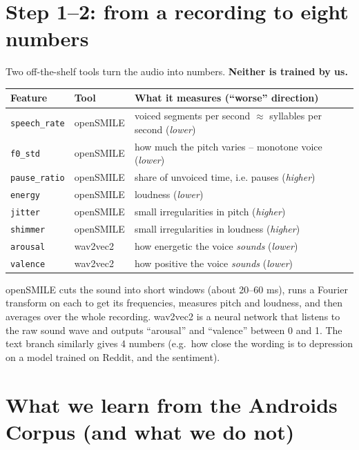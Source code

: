 \documentclass[11pt,a4paper]{article}
\begin{document}
\section{Step 1--2: from a recording to eight numbers}

Two off-the-shelf tools turn the audio into numbers. \textbf{Neither is trained by us.}

\begin{center}
\small
\begin{tabular}{@{}llp{6.6cm}@{}}
\toprule
\textbf{Feature} & \textbf{Tool} & \textbf{What it measures (``worse'' direction)} \\
\midrule
\texttt{speech\_rate} & openSMILE & voiced segments per second $\approx$ syllables per second (\emph{lower})\\
\texttt{f0\_std}      & openSMILE & how much the pitch varies -- monotone voice (\emph{lower})\\
\texttt{pause\_ratio} & openSMILE & share of unvoiced time, i.e. pauses (\emph{higher})\\
\texttt{energy}       & openSMILE & loudness (\emph{lower})\\
\texttt{jitter}       & openSMILE & small irregularities in pitch (\emph{higher})\\
\texttt{shimmer}      & openSMILE & small irregularities in loudness (\emph{higher})\\
\texttt{arousal}      & wav2vec2  & how energetic the voice \emph{sounds} (\emph{lower})\\
\texttt{valence}      & wav2vec2  & how positive the voice \emph{sounds} (\emph{lower})\\
\bottomrule
\end{tabular}
\end{center}

openSMILE cuts the sound into short windows (about 20--60 ms), runs a Fourier transform on each to get
its frequencies, measures pitch and loudness, and then averages over the whole recording.
wav2vec2 is a neural network that listens to the raw sound wave and outputs ``arousal'' and ``valence''
between 0 and 1. The text branch similarly gives 4 numbers (e.g.\ how close the wording is to depression
on a model trained on Reddit, and the sentiment).

\section{What we learn from the Androids Corpus (and what we do not)}
\end{document}
